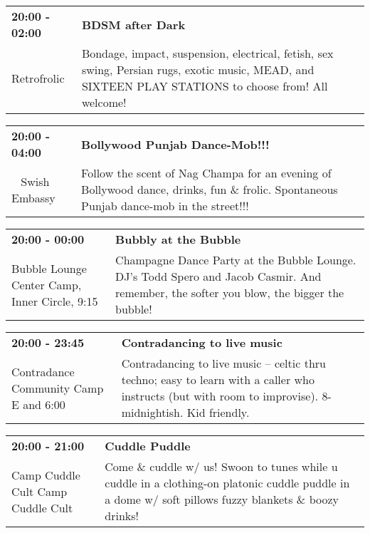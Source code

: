 \begin{tabular}{ p{1in} p{2.2in} }
    \textbf{20:00 - 02:00} & \textbf{BDSM after Dark} \\
    Retrofrolic \newline  & Bondage, impact, suspension, electrical, fetish, sex swing, Persian rugs, exotic music, MEAD, and SIXTEEN PLAY STATIONS to choose from! All welcome! \\
    \hline 
\end{tabular}
    
\begin{tabular}{ p{1in} p{2.2in} }
    \textbf{20:00 - 04:00} & \textbf{Bollywood Punjab Dance-Mob!!!} \\
    ~ \newline Swish Embassy & Follow the scent of Nag Champa for an evening of Bollywood dance, drinks, fun \& frolic. Spontaneous Punjab dance-mob in the street!!! \\
    \hline 
\end{tabular}
    
\begin{tabular}{ p{1in} p{2.2in} }
    \textbf{20:00 - 00:00} & \textbf{Bubbly at the Bubble} \\
    Bubble Lounge \newline Center Camp, Inner Circle, 9:15 & Champagne Dance Party at the Bubble Lounge.  DJ's Todd Spero and Jacob Casmir.   And remember, the softer you blow, the bigger the bubble! \\
    \hline 
\end{tabular}
    
\begin{tabular}{ p{1in} p{2.2in} }
    \textbf{20:00 - 23:45} & \textbf{Contradancing to live music} \\
    Contradance Community Camp \newline E  and 6:00 & Contradancing to live music -- celtic thru techno; easy to learn with a caller who instructs (but with room to improvise). 8-midnightish. Kid friendly. \\
    \hline 
\end{tabular}
    
\begin{tabular}{ p{1in} p{2.2in} }
    \textbf{20:00 - 21:00} & \textbf{Cuddle Puddle} \\
    Camp Cuddle Cult \newline Camp Cuddle Cult & Come \& cuddle w/ us! Swoon to tunes while u cuddle in a clothing-on platonic cuddle puddle in a dome w/ soft pillows fuzzy blankets \& boozy drinks! \\
    \hline 
\end{tabular}
    
